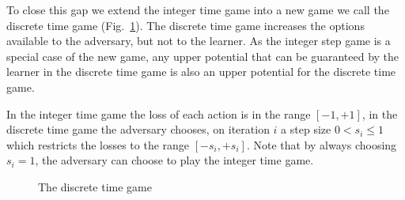 \documentclass{article}[12pt]
\begin{document}
To close this gap we extend the integer time game into a new game we
call the discrete time game (Fig.~\ref{fig:discrete-Time-Game}). The
discrete time game increases the options available to the adversary,
but not to the learner.  As the integer step game is a special case of
the new game, any upper potential that can be guaranteed by the
learner in the discrete time game is also an upper potential for the
discrete time game.

In the integer time game the loss of each action is in the range
$[-1,+1]$, in the discrete time game the adversary chooses, on
iteration $i$ a step size $0<s_i\leq 1$ which restricts the losses to
the range $[-s_i,+s_i]$. Note that by always choosing $s_i=1$,
the adversary can choose to play the integer time game.

\begin{figure}[ht!]
\caption{The discrete time game  \label{fig:discrete-Time-Game}}
\end{figure}
\end{document}
